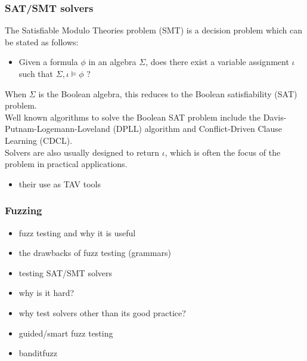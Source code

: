 \documentclass[article,11pt]{article}
\begin{document}
\subsubsection*{SAT/SMT solvers}
\label{sec:orgf633480}
The Satisfiable Modulo Theories problem (SMT) is a decision problem which can be stated as follows\cite{notes:lec17}:\\
\begin{itemize}
\item Given a formula \(\phi\) in an algebra \(\Sigma\), does there exist a variable assignment \(\iota\) such that \(\Sigma,\iota\models \phi\) ?\\
\end{itemize}
When \(\Sigma\) is the Boolean algebra, this reduces to the Boolean satisfiability (SAT) problem.\\
Well known algorithms to solve the Boolean SAT problem include the Davis-Putnam-Logemann-Loveland (DPLL) algorithm and Conflict-Driven Clause Learning (CDCL).\\

Solvers are also usually designed to return \(\iota\), which is often the focus of the problem in practical applications.\\
\begin{itemize}
\item their use as TAV tools\\
\end{itemize}

\subsubsection*{Fuzzing}
\label{sec:org0f5bd4e}
\begin{itemize}
\item fuzz testing and why it is useful\\
\item the drawbacks of fuzz testing (grammars)\\
\item testing SAT/SMT solvers\\
\item why is it hard?\\
\item why test solvers other than its good practice?\\
\item guided/smart fuzz testing\\
\item banditfuzz\\
\end{itemize}
\end{document}
